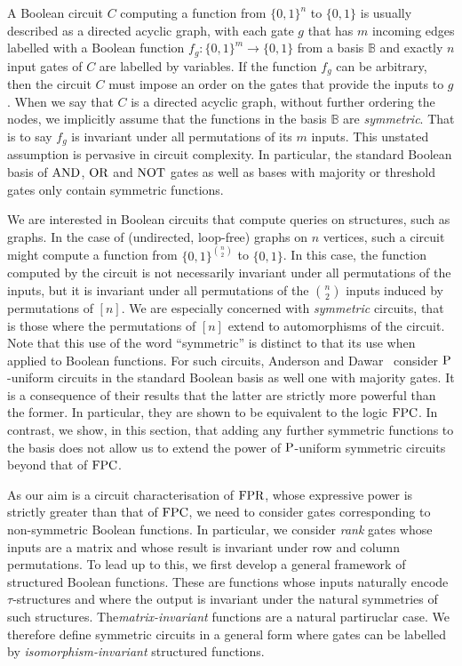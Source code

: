 \documentclass[../paper.tex]{subfiles}
\begin{document}


A Boolean circuit $C$ computing a function from $\{0,1\}^n$ to $\{0,1\}$ is
usually described as a directed acyclic graph, with each gate $g$ that has $m$
incoming edges labelled with a Boolean function $f_g : \{0,1\}^m \rightarrow
\{0,1\}$ from a basis $\mathbb{B}$ and exactly $n$ input gates of $C$ are
labelled by variables. If the function $f_g$ can be arbitrary, then the circuit
$C$ must impose an order on the gates that provide the inputs to $g$. When we
say that $C$ is a directed acyclic graph, without further ordering the nodes, we
implicitly assume that the functions in the basis $\mathbb{B}$ are
\emph{symmetric}. That is to say $f_g$ is invariant under all permutations of
its $m$ inputs. This unstated assumption is pervasive in circuit complexity. In
particular, the standard Boolean basis of $\text{\upshape AND}$, $\text{\upshape OR}$ and $\text{\upshape NOT}$ gates as well as bases
with majority or threshold gates only contain symmetric functions.

We are interested in Boolean circuits that compute queries on structures, such
as graphs. In the case of (undirected, loop-free) graphs on $n$ vertices, such a
circuit might compute a function from $\{0,1\}^{n \choose 2}$ to $\{0,1\}$. In
this case, the function computed by the circuit is not necessarily invariant
under all permutations of the inputs, but it is invariant under all permutations
of the $n \choose 2$ inputs induced by permutations of $[n]$. We are especially
concerned with \emph{symmetric} circuits, that is those where the permutations
of $[n]$ extend to automorphisms of the circuit. Note that this use of the word
``symmetric'' is distinct to that its use when applied to Boolean functions. For
such circuits, Anderson and Dawar~\cite{AndersonD17} consider $\mathrm{P}$-uniform
circuits in the standard Boolean basis as well one with majority gates. It is a
consequence of their results that the latter are strictly more powerful than the
former. In particular, they are shown to be equivalent to the logic $\text{\upshape FPC}$. In
contrast, we show, in this section, that adding any further symmetric functions
to the basis does not allow us to extend the power of $\mathrm{P}$-uniform symmetric
circuits beyond that of $\text{\upshape FPC}$.


As our aim is a circuit characterisation of $\text{\upshape FPR}$, whose expressive power is
strictly greater than that of $\text{\upshape FPC}$, we need to consider gates corresponding to
non-symmetric Boolean functions. In particular, we consider \emph{rank} gates
whose inputs are a matrix and whose result is invariant under row and column
permutations. To lead up to this, we first develop a general framework of
structured Boolean functions. These are functions whose inputs naturally encode
$\tau$-structures and where the output is invariant under the natural symmetries
of such structures. The\emph{matrix-invariant} functions are a natural
partiruclar case. We therefore define symmetric circuits in a general form where
gates can be labelled by \emph{isomorphism-invariant} structured functions.
\end{document}
